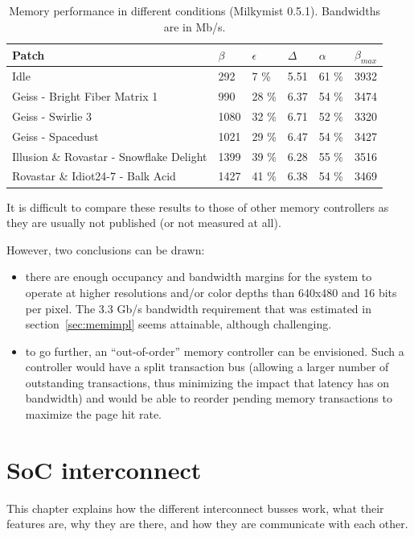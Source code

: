 \documentclass[a4paper,11pt]{kthesis}
\begin{document}
\begin{table}
\centering
\begin{tabular}{|l|l|l|l|l|l|}
\hline
\textbf{Patch} & $\beta$ & $\epsilon$ & $\Delta$ & $\alpha$ & $\beta_{max}$ \\
\hline
Idle & 292 & 7 \% & 5.51 & 61 \% & 3932 \\
\hline
Geiss - Bright Fiber Matrix 1 & 990 & 28 \% & 6.37 & 54 \% & 3474 \\
\hline
Geiss - Swirlie 3 & 1080 & 32 \% & 6.71 & 52 \% & 3320 \\
\hline
Geiss - Spacedust & 1021 & 29 \% & 6.47 & 54 \% & 3427 \\
\hline
Illusion \& Rovastar - Snowflake Delight & 1399 & 39 \% & 6.28 & 55 \% & 3516 \\
\hline
Rovastar \& Idiot24-7 - Balk Acid & 1427 & 41 \% & 6.38 & 54 \% & 3469 \\
\hline
\end{tabular}
\caption{Memory performance in different conditions (Milkymist 0.5.1). Bandwidths are in Mb/s.}\label{tab:memperformance}
\end{table}

It is difficult to compare these results to those of other memory controllers as they are usually not published (or not measured at all).

However, two conclusions can be drawn:
\begin{itemize}
\item there are enough occupancy and bandwidth margins for the system to operate at higher resolutions and/or color depths than 640x480 and 16 bits per pixel. The 3.3 Gb/s bandwidth requirement that was estimated in section~\ref{sec:memimpl} seems attainable, although challenging.
\item to go further, an ``out-of-order'' memory controller can be envisioned. Such a controller would have a split transaction bus (allowing a larger number of outstanding transactions, thus minimizing the impact that latency has on bandwidth) and would be able to reorder pending memory transactions to maximize the page hit rate.
\end{itemize}

\chapter{SoC interconnect}
\label{ch:intercon}
This chapter explains how the different interconnect busses work, what their features are, why they are there, and how they are communicate with each other.
\end{document}

